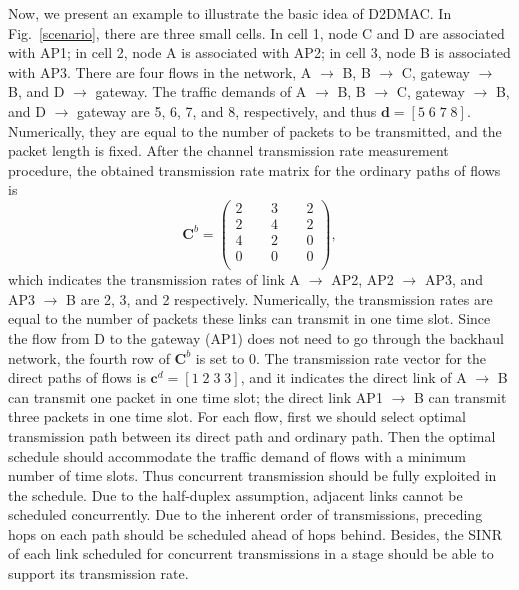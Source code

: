 \documentclass[journal]{IEEEtran}
\begin{document}
Now, we present an example to illustrate the basic idea of D2DMAC. In Fig.~\ref{scenario}, there
are three small cells. In cell 1, node C and D are associated with AP1; in cell 2, node A is
associated with AP2; in cell 3, node B is associated with AP3. There are four flows in the network,
A $\to$ B, B $\to$ C, gateway $\to$ B, and D $\to$ gateway. The traffic demands of A $\to$ B, B
$\to$ C, gateway $\to$ B, and D $\to$ gateway are 5, 6, 7, and 8, respectively, and thus
$\textbf{d}=[5\;6\; 7 \;8]$. Numerically, they are equal to the number of packets to be
transmitted, and the packet length is fixed. After the channel transmission rate measurement
procedure, the obtained transmission rate matrix for the ordinary paths of flows is
\begin{equation}
\textbf{C}^b= \left(
\begin{aligned}
     2 &&~~ 3 &&~~ 2 \\
     2 &&~~ 4 &&~~ 2 \\
     4 &&~~ 2 &&~~ 0 \\
     0 &&~~ 0 &&~~ 0 \\
 \end{aligned}
 \right),\label{eqn:C_b}
\end{equation}
which indicates the transmission rates of link A $\to$ AP2, AP2 $\to$ AP3, and AP3 $\to$ B are 2,
3, and 2 respectively. Numerically, the transmission rates are equal to the number of packets these
links can transmit in one time slot. Since the flow from D to the gateway (AP1) does not need to go
through the backhaul network, the fourth row of $\textbf{C}^b$ is set to 0. The transmission rate
vector for the direct paths of flows is $\textbf{c}^d=[1\;2\; 3 \;3]$, and it indicates the direct
link of A $\to$ B can transmit one packet in one time slot; the direct link AP1 $\to$ B can
transmit three packets in one time slot. For each flow, first we should select optimal transmission
path between its direct path and ordinary path. Then the optimal schedule should accommodate the
traffic demand of flows with a minimum number of time slots. Thus concurrent transmission should be
fully exploited in the schedule. Due to the half-duplex assumption, adjacent links cannot be
scheduled concurrently. Due to the inherent order of transmissions, preceding hops on each path
should be scheduled ahead of hops behind. Besides, the SINR of each link scheduled for concurrent
transmissions in a stage should be able to support its transmission rate.
\end{document}
